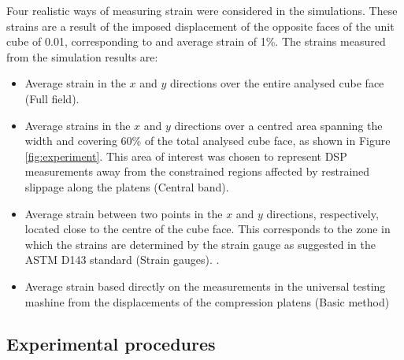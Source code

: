 \documentclass[3p]{elsarticle}
\begin{document}
Four realistic ways of measuring strain were considered in the simulations.
These strains are a result of the imposed displacement of the opposite faces of the unit cube of 0.01, corresponding to and average strain of 1\%.  The strains measured from the simulation results are:
\begin{itemize}
\item Average strain in the $x$ and $y$ directions over the entire analysed cube
face (Full field).
\item Average strains in the $x$ and $y$ directions over a centred area spanning
the width and covering 60\% of the total analysed cube face, as shown in Figure
\ref{fig:experiment}. This area of interest was chosen to represent DSP
measurements away from the constrained regions affected by restrained slippage
along the platens (Central band).
\item Average strain between two points in the $x$ and $y$ directions,
respectively, located close to the centre of the cube face. This corresponds to
the zone in which the strains are determined by the strain gauge as suggested in
the ASTM D143 standard (Strain gauges).
\cite{american2009standard}.
\item Average strain based directly on the 
measurements in the universal testing mashine from the
displacements of the compression platens (Basic method)
\end{itemize}



\subsection{Experimental procedures}
\end{document}
